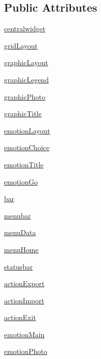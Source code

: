 \subsection*{Public Attributes}
\begin{DoxyCompactItemize}
\item 
\hyperlink{classinterface_1_1_ui___main_window_aca6bb96ccc3c30192ae5b1844b07932f}{centralwidget}
\item 
\hyperlink{classinterface_1_1_ui___main_window_a06f5d6c2958b9c8c3e04f9cebb80c0f7}{grid\+Layout}
\item 
\hyperlink{classinterface_1_1_ui___main_window_a81938a7e7ed80798444209d25e15a18c}{graphic\+Layout}
\item 
\hyperlink{classinterface_1_1_ui___main_window_a2b7dd22f57b329ced9f2a5caefabf66c}{graphic\+Legend}
\item 
\hyperlink{classinterface_1_1_ui___main_window_a04943daa5817a47ae0d195ef964f3bae}{graphic\+Photo}
\item 
\hyperlink{classinterface_1_1_ui___main_window_ad7aae49dc649a616ef238c77c34bb2de}{graphic\+Title}
\item 
\hyperlink{classinterface_1_1_ui___main_window_a4a1c20d5049008bfdea8b64be216a40b}{emotion\+Layout}
\item 
\hyperlink{classinterface_1_1_ui___main_window_a66ddb99f0886467a03a054f81c1e310d}{emotion\+Choice}
\item 
\hyperlink{classinterface_1_1_ui___main_window_ab4bc21ed4fa1a85940c2b386ec8f978f}{emotion\+Title}
\item 
\hyperlink{classinterface_1_1_ui___main_window_afcd18673a4c376e052ec0df7f4ee867a}{emotion\+Go}
\item 
\hyperlink{classinterface_1_1_ui___main_window_a59754fc174453015940b9146108c4500}{bar}
\item 
\hyperlink{classinterface_1_1_ui___main_window_afa10fbc9aae995e1d56d2147431a8500}{menubar}
\item 
\hyperlink{classinterface_1_1_ui___main_window_a1217efcb2f26060a9c385c59818c1961}{menu\+Data}
\item 
\hyperlink{classinterface_1_1_ui___main_window_a68ac1504293ec3fb817ca20909e20f59}{menu\+Home}
\item 
\hyperlink{classinterface_1_1_ui___main_window_a90f97b935de51676c7ed69ada8f2001f}{statusbar}
\item 
\hyperlink{classinterface_1_1_ui___main_window_a27cc253e0fa9a455c2dd0e91ab06b17b}{action\+Export}
\item 
\hyperlink{classinterface_1_1_ui___main_window_aad1d72318df7f1027bcc56b3e37447b3}{action\+Import}
\item 
\hyperlink{classinterface_1_1_ui___main_window_a8cc0e437b4d74bcf12ec2b60af3b5b00}{action\+Exit}
\item 
\hyperlink{classinterface_1_1_ui___main_window_a487d6984ae89e4385426aef6172268c5}{emotion\+Main}
\item 
\hyperlink{classinterface_1_1_ui___main_window_ae03b9929d57fdb7d817678a19c6c6dba}{emotion\+Photo}
\end{DoxyCompactItemize}


